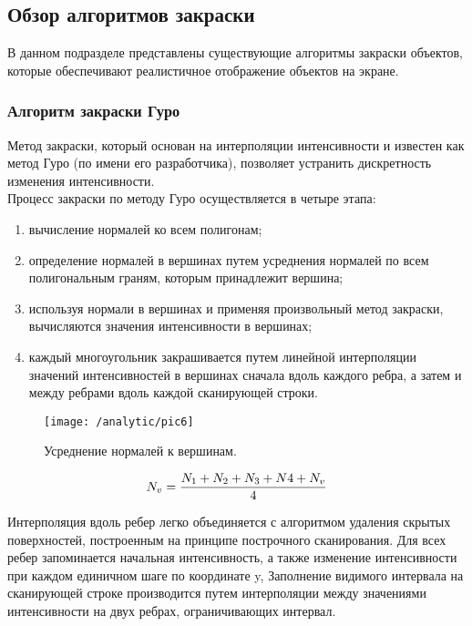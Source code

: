 \subsection{Обзор алгоритмов закраски}\label{subsec:analytic1.2}

В данном подразделе представлены существующие алгоритмы закраски объектов, которые обеспечивают реалистичное отображение объектов на экране.

\subsubsection{Алгоритм закраски Гуро}\label{subsec:analytic1.2.1}

Метод закраски, который основан на интерполяции интенсивности и известен как метод Гуро (по имени его разработчика), позволяет устранить дискретность изменения интенсивности.\\

Процесс закраски по методу Гуро осуществляется в четыре этапа:

\begin{enumerate}
	\item вычисление нормалей ко всем полигонам;
	\item определение нормалей в вершинах путем усреднения нормалей по всем полигональным граням, которым принадлежит вершина;
	\item используя нормали в вершинах и применяя произвольный метод закраски, вычисляются значения интенсивности в вершинах;
	\item каждый многоугольник закрашивается путем линейной интерполяции значений интенсивностей в вершинах сначала вдоль каждого ребра, а затем и между ребрами вдоль каждой сканирующей строки.
\end{enumerate}

\begin{figure}[H]
\center
\texttt{[image: /analytic/pic6]}
\caption{Усреднение нормалей к вершинам.}
\end{figure}

\begin{equation}
	N_{v} =  \frac{N_{1} + N_{2} + N_{3} + N{4} + N_{v}}{4} \notag
\end{equation}

Интерполяция вдоль ребер легко объединяется с алгоритмом удаления скрытых поверхностей, построенным на принципе построчного сканирования. Для всех ребер запоминается начальная интенсивность, а также изменение интенсивности при каждом единичном шаге по координате y, Заполнение видимого интервала на сканирующей строке производится путем интерполяции между значениями интенсивности на двух ребрах, ограничивающих интервал.

